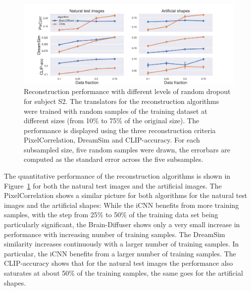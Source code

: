 \begin{figure}[ht]
  \centering
  \includegraphics[width=1\textwidth]{plots/dropout_random_reconstruction.png}
  \caption[Reconstruction Performance with increasing dropout]{Reconstruction performance with different levels of random dropout for subject S2. The translators for the reconstruction algorithms were trained with random samples of the training dataset at different sizes (from 10\% to 75\% of the original size). The performance is displayed using the three reconstruction criteria PixelCorrelation, DreamSim and CLIP-accuracy. For each subsampled size, five random samples were drawn, the errorbars are computed as the standard error across the five subsamples.}\label{fig:dropout_random_reconstruction}
\end{figure}

The quantitative performance of the reconstruction algorithms is shown in Figure~\ref{fig:dropout_random_reconstruction} for both the natural test images and the artificial images. The PixelCorrelation shows a similar picture for both algorithms for the natural test images and the artificial shapes: While the iCNN benefits from more training samples, with the step from 25\% to 50\% of the training data set being particularly significant, the Brain-Diffuser shows only a very small increase in performance with increasing number of training samples. The DreamSim similarity increases continuously with a larger number of training samples. In particular, the iCNN benefits from a larger number of training samples. The CLIP-accuracy shows that for the natural test images the performance also saturates at about 50\% of the training samples, the same goes for the artificial shapes.

